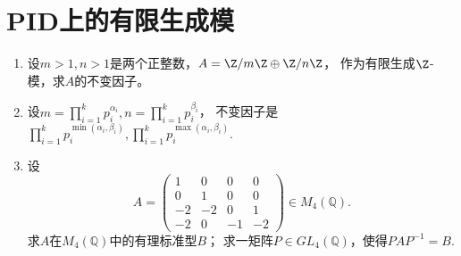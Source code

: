 \section{PID上的有限生成模}
\begin{enumerate}
    \item[4.1] 设$m>1,n>1$是两个正整数，$A=\Z/m\Z\oplus\Z/n\Z$，
    作为有限生成$\Z$-模，求$A$的不变因子。
    
    \item[\textbf{解答:}]
    设$m=\prod\limits_{i=1}^kp_i^{\alpha_i},n=\prod\limits_{i=1}^kp_i^{\beta_i}$，
    不变因子是$\prod\limits_{i=1}^kp_i^{\min(\alpha_i,\beta_i)},
    \prod\limits_{i=1}^kp_i^{\max(\alpha_i,\beta_i)}$.
    
    \item[4.2] 设
    $$A=\begin{pmatrix}
        1&0&0&0\\0&1&0&0\\-2&-2&0&1\\-2&0&-1&-2
    \end{pmatrix}\in M_4(\mathbb{Q}).$$
    求$A$在$M_4(\mathbb{Q})$中的有理标准型$B$；
    求一矩阵$P\in GL_4(\mathbb{Q})$，使得$PAP^{-1}=B$.


\end{enumerate}
